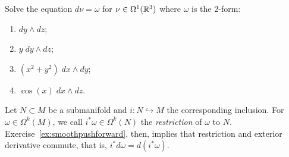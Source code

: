 \begin{exercise}
	Solve the equation $d \nu = \omega$ for $\nu \in \Omega^1(\mathbb{R}^3)$ where $\omega$ is the $2$-form:
	\begin{enumerate}
		\item $d y \wedge d z$;
		\item $y\; d y \wedge d z$;
		\item $(x^2 + y^2) \; d x \wedge d y$;
		\item $\cos(x)\; d x \wedge d z$.
	\end{enumerate}
\end{exercise}

Let $N\subset M$ be a submanifold and $i:N\hookrightarrow M$ the corresponding inclusion.
For $\omega\in\Omega^k(M)$, we call $i^*\omega \in \Omega^k(N)$ the \emph{restriction} of $\omega$ to $N$.
Exercise~\ref{ex:smoothpushforward}, then, implies that restriction and exterior derivative commute, that is, $i^*d\omega = d(i^*\omega)$.


